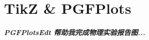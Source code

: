 
\part{TikZ \& PGFPlots}

\begin{frame}
    \frametitle{PGFPlotsEdt 帮助我完成物理实验报告图...}
    
\end{frame}